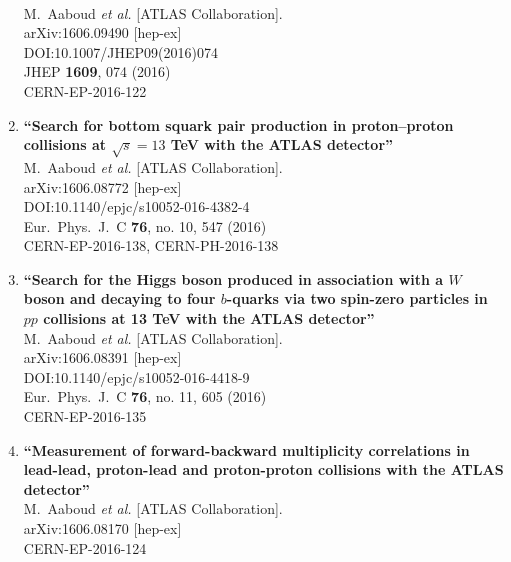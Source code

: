 \documentclass{article}
\begin{document}
\begin{enumerate}
  \\{}M.~Aaboud {\it et al.} [ATLAS Collaboration].
  \\{}arXiv:1606.09490 [hep-ex]
  \\{}DOI:10.1007/JHEP09(2016)074
  \\{}JHEP {\bf 1609}, 074 (2016)
  \\{}CERN-EP-2016-122
\item%
{\bf ``Search for bottom squark pair production in proton–proton collisions at $\sqrt{s}=13$  TeV with the ATLAS detector''}
  \\{}M.~Aaboud {\it et al.} [ATLAS Collaboration].
  \\{}arXiv:1606.08772 [hep-ex]
  \\{}DOI:10.1140/epjc/s10052-016-4382-4
  \\{}Eur.\ Phys.\ J.\ C {\bf 76}, no. 10, 547 (2016)
  \\{}CERN-EP-2016-138, CERN-PH-2016-138
\item%
{\bf ``Search for the Higgs boson produced in association with a $W$ boson and decaying to four $b$-quarks via two spin-zero particles in $pp$ collisions at 13 TeV with the ATLAS detector''}
  \\{}M.~Aaboud {\it et al.} [ATLAS Collaboration].
  \\{}arXiv:1606.08391 [hep-ex]
  \\{}DOI:10.1140/epjc/s10052-016-4418-9
  \\{}Eur.\ Phys.\ J.\ C {\bf 76}, no. 11, 605 (2016)
  \\{}CERN-EP-2016-135
\item%
{\bf ``Measurement of forward-backward multiplicity correlations in lead-lead, proton-lead and proton-proton collisions with the ATLAS detector''}
  \\{}M.~Aaboud {\it et al.} [ATLAS Collaboration].
  \\{}arXiv:1606.08170 [hep-ex]
  \\{}CERN-EP-2016-124

\end{enumerate}
\end{document}
